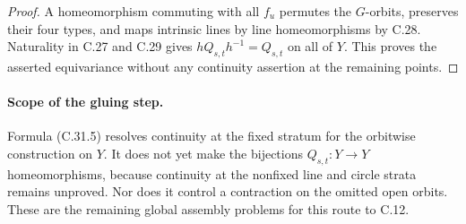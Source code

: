 \begin{proof}
A homeomorphism commuting with all $f_u$ permutes the $G$-orbits,
preserves their four types, and maps intrinsic lines by line
homeomorphisms by C.28. Naturality in C.27 and C.29 gives
$hQ_{s,t}h^{-1}=Q_{s,t}$ on all of $Y$. This proves the asserted
equivariance without any continuity assertion at the remaining
points.
\end{proof}

\paragraph{Scope of the gluing step.}
Formula (C.31.5) resolves continuity at the fixed stratum for the
orbitwise construction on $Y$. It does not yet make the bijections
$Q_{s,t}:Y\to Y$ homeomorphisms, because continuity at the nonfixed
line and circle strata remains unproved. Nor does it control a
contraction on the omitted open orbits. These are the remaining
global assembly problems for this route to C.12.
